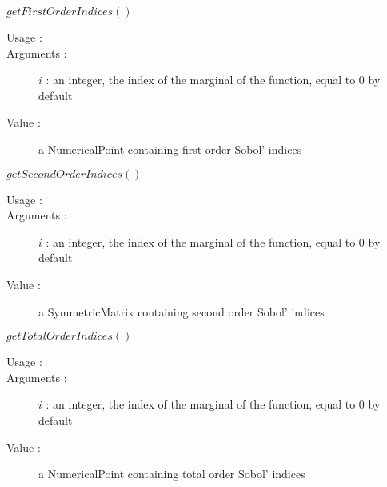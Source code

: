 \begin{description}
\begin{description}
  \item $getFirstOrderIndices()$
    \begin{description}
    \item[Usage :] \strut
    \item[Arguments :] $i$ : an integer, the index of the marginal of the function, equal to 0 by default
    \item[Value :] a NumericalPoint containing first order Sobol' indices
    \end{description}
    \bigskip

  \item $getSecondOrderIndices()$
    \begin{description}
    \item[Usage :] \strut
    \item[Arguments :] $i$ : an integer, the index of the marginal of the function, equal to 0 by default
    \item[Value :] a SymmetricMatrix containing second order Sobol' indices
    \end{description}
    \bigskip

  \item $getTotalOrderIndices()$
    \begin{description}
    \item[Usage :] \strut
    \item[Arguments :] $i$ : an integer, the index of the marginal of the function, equal to 0 by default
    \item[Value :] a NumericalPoint containing total order Sobol' indices
    \end{description}
    \bigskip

  \end{description}

\end{description}

